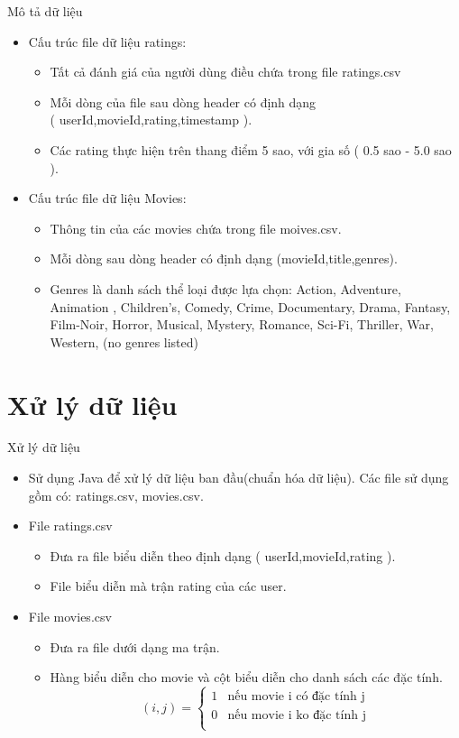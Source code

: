 \documentclass{beamer}
\newcommand{\bi}{\begin{itemize}}
\newcommand{\ei}{\end{itemize}}
\begin{document}
\begin{frame}{Mô tả dữ liệu}
\bi
\item Cấu trúc file dữ liệu ratings:
\bi
\item Tất cả đánh giá của người dùng điều chứa trong file ratings.csv
\item Mỗi dòng của file sau dòng header có định dạng\\( userId,movieId,rating,timestamp ).
\item Các rating thực hiện trên thang điểm 5 sao, với gia số ( 0.5 sao - 5.0 sao ).
\ei
\item Cấu trúc file dữ liệu Movies:
\bi
\item Thông tin của các movies chứa trong file moives.csv.
\item Mỗi dòng sau dòng header có định dạng (movieId,title,genres).
\item Genres là danh sách thể loại được lựa chọn: Action, Adventure, Animation , Children's, Comedy, Crime, Documentary, Drama, Fantasy, Film-Noir, Horror, Musical, Mystery, Romance, Sci-Fi, Thriller, War, Western, (no genres listed)
\ei
\ei
\end{frame}

\section{Xử lý dữ liệu}
\begin{frame}{Xử lý dữ liệu}
\begin{itemize}
\item Sử dụng Java để xử lý dữ liệu ban đầu(chuẩn hóa dữ liệu). Các file sử dụng gồm có: ratings.csv, movies.csv.
\item File ratings.csv
\bi 
\item Đưa ra file biểu diễn theo định dạng ( userId,movieId,rating ). 
\item File biểu diễn mà trận rating của các user.
\ei
\item File movies.csv
\bi
\item Đưa ra file dưới dạng ma trận.
\item Hàng biểu diễn cho movie và cột biểu diễn cho danh sách các đặc tính.  
\begin{displaymath}
(i,j) = \left\{ \begin{array}{ll}
1 & \textrm{nếu movie i có đặc tính j}\\
0 & \textrm{nếu movie i ko đặc tính j}\\
\end{array} \right.
\end{displaymath}
\ei
\end{itemize} 
\end{frame}
\end{document}
